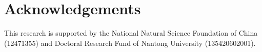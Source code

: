 \documentclass[a4paper,12pt]{article}
\numberwithin{equation}{section}
\numberwithin{algorithm}{section}
\theoremstyle{remark}
\theoremstyle{definition}
\begin{document}
\section*{Acknowledgements}

This research is supported by the National Natural Science Foundation of China (12471355) and Doctoral Research Fund of Nantong University  (135420602001).

%

\end{document}
